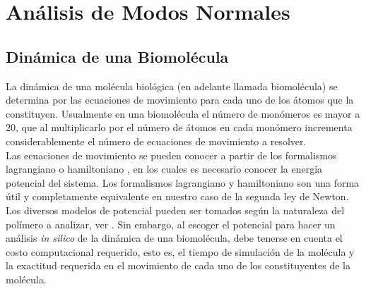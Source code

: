 \chapter{An\'{a}lisis de Modos Normales}\label{ch:2}

\section{Din\'{a}mica de una Biomol\'{e}cula}

La din\'{a}mica de una mol\'{e}cula biol\'{o}gica (en adelante llamada biomol\'{e}cula) se determina por las ecuaciones de movimiento para cada uno de los \'{a}tomos que la constituyen. Usualmente en una biomol\'{e}cula el n\'{u}mero de mon\'{o}meros es mayor a 20, que al multiplicarlo por el n\'{u}mero de \'{a}tomos en cada mon\'{o}mero incrementa considerablemente el n\'{u}mero de ecuaciones de movimiento a resolver.\\


Las ecuaciones de movimiento se pueden conocer a partir de los formalismos lagrangiano o hamiltoniano \cite{Goldstein2001}, en los cuales es necesario conocer la  energ\'{i}a potencial del sistema. Los formalismos lagrangiano y hamiltoniano son una forma \'{u}til y completamente equivalente en nuestro caso de la segunda ley de Newton.\\

Los diversos modelos de potencial pueden ser tomados seg\'{u}n la naturaleza del pol\'{i}mero a analizar, ver \cite{Lezon2009}. Sin embargo, al escoger el potencial  para hacer un an\'{a}lisis \textit{in silico} de la din\'{a}mica de una biomol\'{e}cula, debe tenerse en cuenta el costo computacional requerido, esto es, el tiempo de simulaci\'{o}n de la mol\'{e}cula y la exactitud requerida en el movimiento de cada uno de los constituyentes de la mol\'{e}cula.\\
 
